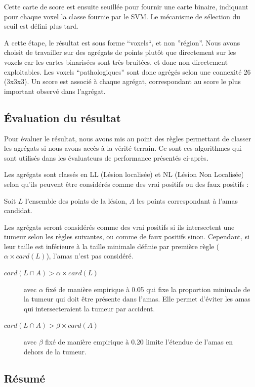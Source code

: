Cette carte de score est ensuite seuillée pour fournir une carte binaire, indiquant pour chaque voxel la classe fournie par le SVM. Le mécanisme de sélection du seuil est défini plus tard. 

A cette étape, le résultat est sous forme ``voxels``, et non ''région''. Nous avons choisit de travailler sur des agrégats de points plutôt que directement sur les voxels car les cartes binarisées sont très bruitées, et donc non directement exploitables. Les voxels ``pathologiques'' sont donc agrégés selon une connexité 26 (3x3x3). Un score est associé à chaque  agrégat, correspondant au score le plus important observé dans l'agrégat.

\subsection{Évaluation du résultat}

Pour évaluer le résultat, nous avons mis au point des règles permettant de classer les agrégats si nous avons accès à la vérité terrain. Ce sont ces algorithmes qui sont utilisés dans les évaluateurs de performance présentés ci-après.

Les agrégats sont classés en LL (Lésion localisée) et NL (Lésion Non Localisée) selon qu'ils peuvent être considérés comme des vrai positifs ou des faux positifs :

Soit $L$ l'ensemble des points de la lésion, $A$ les points correspondant à l'amas candidat.

Les agrégats seront considérés comme des vrai positifs si ils intersectent une tumeur selon les règles suivantes, ou comme de faux positifs sinon. Cependant, si leur taille est inférieure à la taille minimale définie par première règle ($\alpha \times card( L )$), l'amas n'est pas considéré.

\begin{description}
 \item[$card( L \cap A ) > \alpha \times card( L )$] avec $\alpha$ fixé de manière empirique à 0.05 qui fixe la proportion minimale de la tumeur qui doit être présente dans l'amas. Elle permet d'éviter les amas qui intersecteraient la tumeur par accident.
 \item[$card( L \cap A ) > \beta \times card( A )$]  avec $\beta$ fixé de manière empirique à 0.20 limite l'étendue de l'amas en dehors de la tumeur.
\end{description}


\subsection{Résumé}

